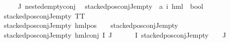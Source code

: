 \begin{isabellebody}
{\isachardoublequoteopen}{\isacharparenleft}{\kern0pt}{\isasymforall}{\isasympsi}\ {\isasymin}\ {\isacharparenleft}{\kern0pt}{\isasymPhi}\ {\isacharbackquote}{\kern0pt}\ J{\isacharparenright}{\kern0pt}{\isachardot}{\kern0pt}\ nested{\isacharunderscore}{\kern0pt}empty{\isacharunderscore}{\kern0pt}conj\ {\isasympsi}{\isacharparenright}{\kern0pt}{\isachardoublequoteclose}\isanewline
\isanewline
{}\isamarkupfalse%
\ stacked{\isacharunderscore}{\kern0pt}pos{\isacharunderscore}{\kern0pt}conj{\isacharunderscore}{\kern0pt}J{\isacharunderscore}{\kern0pt}empty\ {\isacharcolon}{\kern0pt}{\isacharcolon}{\kern0pt}\ {\isachardoublequoteopen}{\isacharparenleft}{\kern0pt}{\isacharprime}{\kern0pt}a{\isacharcomma}{\kern0pt}\ {\isacharprime}{\kern0pt}i{\isacharparenright}{\kern0pt}\ hml\ {\isasymRightarrow}\ bool{\isachardoublequoteclose}\isanewline
\ \ \isanewline
{\isachardoublequoteopen}stacked{\isacharunderscore}{\kern0pt}pos{\isacharunderscore}{\kern0pt}conj{\isacharunderscore}{\kern0pt}J{\isacharunderscore}{\kern0pt}empty\ TT{\isachardoublequoteclose}\ {\isacharbar}{\kern0pt}\isanewline
{\isachardoublequoteopen}stacked{\isacharunderscore}{\kern0pt}pos{\isacharunderscore}{\kern0pt}conj{\isacharunderscore}{\kern0pt}J{\isacharunderscore}{\kern0pt}empty\ {\isacharparenleft}{\kern0pt}hml{\isacharunderscore}{\kern0pt}pos\ {\isacharunderscore}{\kern0pt}\ {\isasympsi}{\isacharparenright}{\kern0pt}{\isachardoublequoteclose}\ \ {\isachardoublequoteopen}stacked{\isacharunderscore}{\kern0pt}pos{\isacharunderscore}{\kern0pt}conj{\isacharunderscore}{\kern0pt}J{\isacharunderscore}{\kern0pt}empty\ {\isasympsi}{\isachardoublequoteclose}\ {\isacharbar}{\kern0pt}\isanewline
{\isachardoublequoteopen}stacked{\isacharunderscore}{\kern0pt}pos{\isacharunderscore}{\kern0pt}conj{\isacharunderscore}{\kern0pt}J{\isacharunderscore}{\kern0pt}empty\ {\isacharparenleft}{\kern0pt}hml{\isacharunderscore}{\kern0pt}conj\ I\ J\ {\isasymPhi}{\isacharparenright}{\kern0pt}{\isachardoublequoteclose}\isanewline
{}\ {\isachardoublequoteopen}{\isasymforall}{\isasymphi}\ {\isasymin}\ {\isacharparenleft}{\kern0pt}{\isasymPhi}\ {\isacharbackquote}{\kern0pt}\ I{\isacharparenright}{\kern0pt}{\isachardot}{\kern0pt}\ {\isacharparenleft}{\kern0pt}stacked{\isacharunderscore}{\kern0pt}pos{\isacharunderscore}{\kern0pt}conj{\isacharunderscore}{\kern0pt}J{\isacharunderscore}{\kern0pt}empty\ {\isasymphi}{\isacharparenright}{\kern0pt}{\isachardoublequoteclose}\ {\isachardoublequoteopen}{\isasymPhi}\ {\isacharbackquote}{\kern0pt}\ J\ {\isacharequal}{\kern0pt}\ {\isacharbraceleft}{\kern0pt}{\isacharbraceright}{\kern0pt}{\isachardoublequoteclose}\isanewline

\end{isabellebody}
